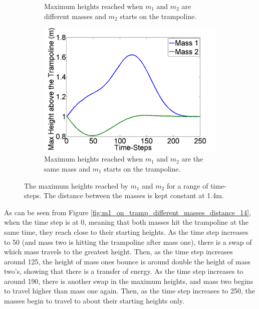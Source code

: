 \begin{figure}[H]
\begin{subfigure}[t]{0.3\textwidth}
    	\caption{Maximum heights reached when $m_1$ and $m_2$ are different masses and $m_2$ starts on the trampoline.}\label{fig:m2_on_tramp_different_masses_distance_14}
    \end{subfigure}\hfill
    \begin{subfigure}[t]{0.3\textwidth}
		\includegraphics[width=\textwidth]{m1_on_tramp_same_masses_distance_14.png}
    	\caption{Maximum heights reached when $m_1$ and $m_2$ are the same mass and $m_1$ starts on the trampoline.}\label{fig:m1_on_tramp_same_masses_distance_14}
    \end{subfigure}\hfill
    \caption{The maximum heights reached by $m_1$ and $m_2$ for a range of time-steps. The distance between the masses is kept constant at 1.4m.}\label{fig:distance_14}
\end{figure}

\noindent As can be seen from Figure \ref{fig:m1_on_tramp_different_masses_distance_14}, when the time step is at 0, meaning that both masses hit the trampoline at the same time, they reach close to their starting heights. As the time step increases to 50 (and mass two is hitting the trampoline after mass one), there is a swap of which mass travels to the greatest height. Then, as the time step increases around 125, the height of mass ones bounce is around double the height of mass two's, showing that there is a transfer of energy. As the time step increases to around 190, there is another swap in the maximum heights, and mass two begins to travel higher than mass one again. Then, as the time step increases to 250, the masses begin to travel to about their starting heights only. \\

